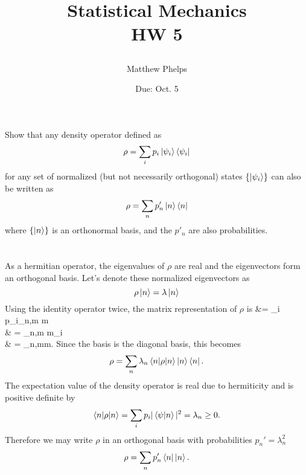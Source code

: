 \documentclass[11pt,letterpaper]{article}
\title{\begin{spacing}{1.2}Statistical Mechanics\\HW 5\end{spacing}}
\author{Matthew Phelps}
\date{Due: Oct. 5}
\begin{document}
\maketitle

\benum
  	\item[\textbf{5.1}]
	Show that any density operator defined as
	\[
		\rho = \sum_i p_i\ket{\psi_i}\bra{\psi_i}
	\]
	for any set of normalized (but not necessarily orthogonal) states $\{\ket{\psi_i}\}$ can also be written as
	\[
		\rho = \sum_n p_n'\ket{n}\bra{n}
	\]
	where $\{\ket{n}\}$ is an orthonormal basis, and the $p'_n$ are also probabilities. 
	\\
	\\\\
	As a hermitian operator, the eigenvalues of $\rho$ are real and the eigenvectors form an orthogonal basis. Let's
	denote these normalized eigenvectors as 
	\[
		\rho \ket{n} = \lambda \ket n
	\]
	Using the identity operator twice, the matrix representation of $\rho$ is 
	\ba
		\rho &= \sum_i p_i\sum_{n,m} \bra m\\
		& = \sum_{n,m} \bra m\sum_{i} \\
		& = \sum_{n,m}\bra m.
	\ea
	Since the basis is the diagonal basis, this becomes
	\[
		\rho = \sum_n \lambda_n \braket{n|\rho|n}\ket n\bra n.
    	\]
	The expectation value of the density operator is real due to hermiticity and is positive definite by
	\[
		\braket{n|\rho|n} = \sum_i p_i |\braket{\psi|n}|^2 =\lambda_n \ge 0.
	\]
	Therefore we may write $\rho$ in an orthogonal basis with probabilities $p_n'=\lambda_n^2$
	\[
		\rho = \sum_n p_n'\bra n\ket n.
	\]
	
\end{document}
